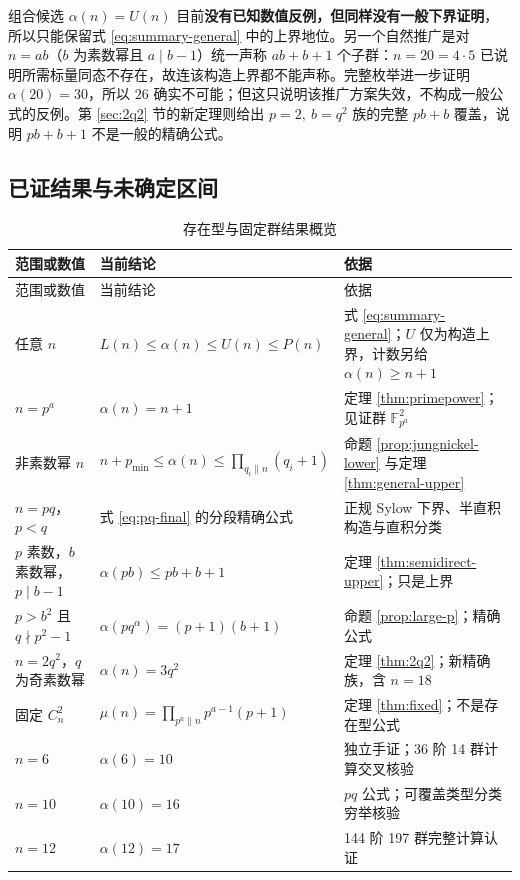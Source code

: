 \documentclass[11pt,a4paper]{article}
\numberwithin{equation}{section}
\theoremstyle{plain}
\theoremstyle{definition}
\theoremstyle{remark}
\newcommand{\F}{\mathbb{F}}
\begin{document}
组合候选 $\alpha(n)=U(n)$ 目前\textbf{没有已知数值反例，但同样没有一般下界证明}，所以只能保留式 \eqref{eq:summary-general} 中的上界地位。另一个自然推广是对 $n=ab$（$b$ 为素数幂且 $a\mid b-1$）统一声称 $ab+b+1$ 个子群：$n=20=4\cdot5$ 已说明所需标量同态不存在，故连该构造上界都不能声称。完整枚举进一步证明 $\alpha(20)=30$，所以 $26$ 确实不可能；但这只说明该推广方案失效，不构成一般公式的反例。第 \ref{sec:2q2} 节的新定理则给出 $p=2,\ b=q^2$ 族的完整 $pb+b$ 覆盖，说明 $pb+b+1$ 不是一般的精确公式。

\subsection{已证结果与未确定区间}
\begin{center}
\small
\begin{longtable}{p{}p{}p{}}
\caption{存在型与固定群结果概览}\label{tab:results}\\
\toprule
范围或数值 & 当前结论 & 依据\\
\midrule
\endfirsthead
\toprule
范围或数值 & 当前结论 & 依据\\
\midrule
\endhead
任意 $n$ & $L(n)\le\alpha(n)\le U(n)\le P(n)$ & 式 \eqref{eq:summary-general}；$U$ 仅为构造上界，计数另给 $\alpha(n)\ge n+1$\\
$n=p^a$ & $\alpha(n)=n+1$ & 定理 \ref{thm:primepower}；见证群 $\F_{p^a}^2$\\
非素数幂 $n$ & $n+p_{\min}\le\alpha(n)\le\prod_{q_i\parallel n}(q_i+1)$ & 命题 \ref{prop:jungnickel-lower} 与定理 \ref{thm:general-upper}\\
$n=pq$，$p<q$ & 式 \eqref{eq:pq-final} 的分段精确公式 & 正规 Sylow 下界、半直积构造与直积分类\\
$p$ 素数，$b$ 素数幂，$p\mid b-1$ & $\alpha(pb)\le pb+b+1$ & 定理 \ref{thm:semidirect-upper}；只是上界\\
$p>b^2$ 且 $q\nmid p^2-1$ & $\alpha(pq^\alpha)=(p+1)(b+1)$ & 命题 \ref{prop:large-p}；精确公式\\
$n=2q^2$，$q$ 为奇素数幂 & $\alpha(n)=3q^2$ & 定理 \ref{thm:2q2}；新精确族，含 $n=18$\\
固定 $C_n^2$ & $\mu(n)=\prod_{p^a\parallel n}p^{a-1}(p+1)$ & 定理 \ref{thm:fixed}；不是存在型公式\\
$n=6$ & $\alpha(6)=10$ & 独立手证；36 阶 14 群计算交叉核验\\
$n=10$ & $\alpha(10)=16$ & $pq$ 公式；可覆盖类型分类穷举核验\\
$n=12$ & $\alpha(12)=17$ & 144 阶 197 群完整计算认证\\

\end{longtable}
\end{center}
\end{document}
